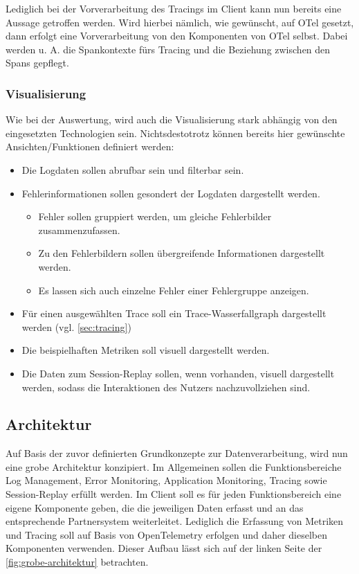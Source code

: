 	Lediglich bei der Vorverarbeitung des Tracings im Client kann nun bereits eine Aussage getroffen werden. Wird hierbei nämlich, wie gewünscht, auf OTel gesetzt, dann erfolgt eine Vorverarbeitung von den Komponenten von OTel selbst. Dabei werden u. A. die Spankontexte fürs Tracing und die Beziehung zwischen den Spans gepflegt.
	
	\subsubsection{Visualisierung}
		
	Wie bei der Auswertung, wird auch die Visualisierung stark abhängig von den eingesetzten Technologien sein. Nichtsdestotrotz können bereits hier gewünschte Ansichten/Funktionen definiert werden:
	
	\begin{itemize}
		\item Die Logdaten sollen abrufbar sein und filterbar sein.
		\item Fehlerinformationen sollen gesondert der Logdaten dargestellt werden.
		\begin{itemize}
			\item Fehler sollen gruppiert werden, um gleiche Fehlerbilder zusammenzufassen.
			\item Zu den Fehlerbildern sollen übergreifende Informationen dargestellt werden.
			\item Es lassen sich auch einzelne Fehler einer Fehlergruppe anzeigen.
		\end{itemize}
		\item Für einen ausgewählten Trace soll ein Trace-Wasserfallgraph dargestellt werden (vgl. \autoref{sec:tracing})
		\item Die beispielhaften Metriken soll visuell dargestellt werden.
		\item Die Daten zum Session-Replay sollen, wenn vorhanden, visuell dargestellt werden, sodass die Interaktionen des Nutzers nachzuvollziehen sind.
	\end{itemize}
	
	\subsection{Architektur}

	Auf Basis der zuvor definierten Grundkonzepte zur Datenverarbeitung, wird nun eine grobe Architektur konzipiert. Im Allgemeinen sollen die Funktionsbereiche Log Management, Error Monitoring, Application Monitoring, Tracing sowie Session-Replay erfüllt werden. Im Client soll es für jeden Funktionsbereich eine eigene Komponente geben, die die jeweiligen Daten erfasst und an das entsprechende Partnersystem weiterleitet. Lediglich die Erfassung von Metriken und Tracing soll auf Basis von OpenTelemetry erfolgen und daher dieselben Komponenten verwenden. Dieser Aufbau lässt sich auf der linken Seite der \autoref{fig:grobe-architektur} betrachten.
	
